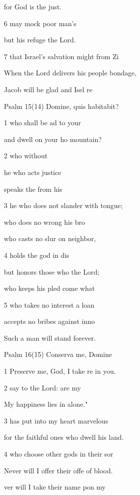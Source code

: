 for God is  the just. 

6  may mock  poor man's  

but his refuge  the Lord. 

7  that Israel's salvation might  from Zi 

When the Lord delivers his people  bondage, 

 Jacob will be glad and Isel re 

Psalm 15(14) Domine, quis habitabit? 


1  who shall be ad to your  

and dwell on your ho mountain? 

2  who  without  

he who acts  justice 

 speaks the  from his  

3 he who does not slander with  tongue; 

 who does no wrong  his bro 

who casts no slur on  neighbor, 

4  holds the god in dis 

but honors those who  the Lord; 

 who keeps his pled come what  

5 who takes no interest  a loan 

 accepts no bribes against  inno 

Such a man will stand  forever. 

Psalm 16(15) Conserva me, Domine 


1 Preserve me, God, I take re in you. 

2  say to the Lord:  are my  

My happiness lies in  alone." 

3  has put into my heart  marvelous  

for the faithful ones who dwell  his land. 

4  who choose other gods in their sor 

Never will I offer their offe of blood. 

ver will I take their name pon my  

